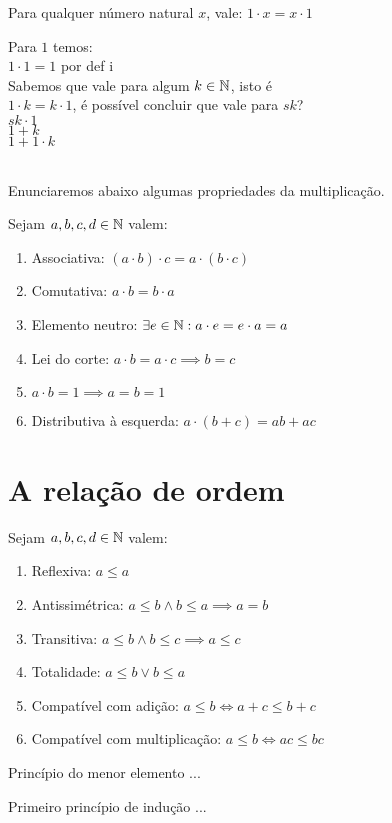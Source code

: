 \documentclass[../main.tex]{subfiles}
\begin{document}
\begin{lema}
	Para qualquer número natural $x$, vale: $1 \cdot x = x \cdot 1$
\end{lema}
\begin{dem}
		Para $1$ temos: \\
		$1 \cdot 1 = 1$ por def i\\
		Sabemos que vale para algum $k \in \mathbb{N}$, isto é \\
		$1 \cdot k = k \cdot 1$, é possível concluir que vale para $sk$? \\
		$sk \cdot 1$ \\
		$1 + k$ \\
		$1 + 1 \cdot k$ 
\end{dem}
\\
Enunciaremos abaixo algumas propriedades da multiplicação.
\begin{prop}{Sejam $a, b, c, d \in \mathbb{N}$ valem:}
    \begin{enumerate}[label=(\roman*)]
        \item Associativa: $(a \cdot b) \cdot c = a \cdot (b \cdot c)$
        \item Comutativa: $a \cdot b = b \cdot a$
        \item Elemento neutro: $\exists e \in \mathbb{N} : a \cdot e = e \cdot a = a$
        \item Lei do corte: $a \cdot b = a \cdot c \implies b = c$
        \item $a \cdot b = 1 \implies a = b = 1$
        \item Distributiva à esquerda: $a \cdot (b + c) = ab + ac$
    \end{enumerate}
\end{prop}

\section{A relação de ordem}
\begin{prop}{Sejam $a, b, c, d \in \mathbb{N}$ valem:}
    \begin{enumerate}[label=(\roman*)]
        \item Reflexiva: $a \leq a$
        \item Antissimétrica: $a \leq b \land b \leq a \implies a = b$
        \item Transitiva: $a \leq b \land b \leq c \implies a \leq c$
        \item Totalidade: $a \leq b \lor b \leq a$
        \item Compatível com adição: $a \leq b \iff a + c \leq b + c$
        \item Compatível com multiplicação: $a \leq b \iff ac \leq bc$
    \end{enumerate}
\end{prop}
\begin{teo}{Princípio do menor elemento}
...
\end{teo}
\begin{teo}{Primeiro princípio de indução}
...
\end{teo}
\end{document}
